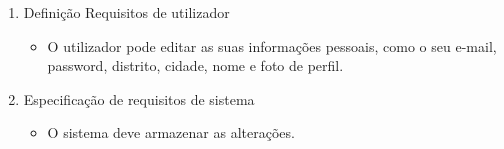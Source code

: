 \begin{enumerate}
    \item Definição Requisitos de utilizador
    \begin{itemize}
        \item O utilizador pode editar as suas informações pessoais, como o seu e-mail, password, distrito, cidade, nome e foto de perfil.
    \end{itemize}
    \item Especificação de requisitos de sistema
    \begin{itemize}
        \item O sistema deve armazenar as alterações.
    \end{itemize}
\end{enumerate}